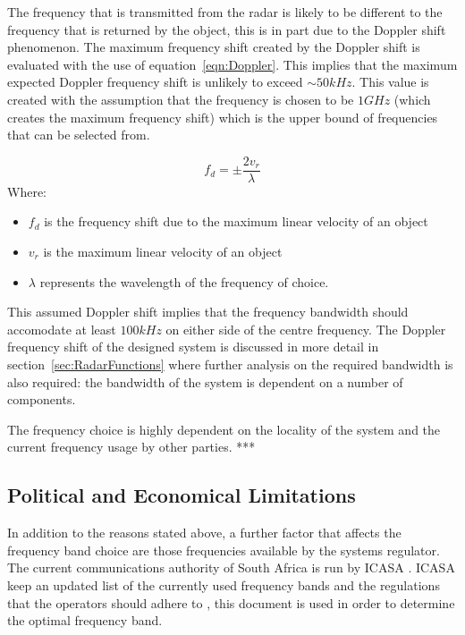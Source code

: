 \documentclass[11pt]{witseiepaper}
\begin{document}
The frequency that is transmitted from the radar is likely to be different to the frequency that is returned by the object, this is in part due to the Doppler shift phenomenon. The maximum frequency shift created by the Doppler shift is evaluated with the use of equation~\ref{eqn:Doppler}. This implies that the maximum expected Doppler frequency shift is unlikely to exceed $\sim 50 kHz$. This value is created with the assumption that the frequency is chosen to be $1 GHz$ (which creates the maximum frequency shift) which is the upper bound of frequencies that can be selected from.


\begin{equation} \label{eqn:Doppler}
    f_{d} = \pm \frac{2 v_{r}}{\lambda}    
\end{equation}
Where:
\begin{itemize}
    \item $f_{d}$ is the frequency shift due to the maximum linear velocity of an object
    \item $v_{r}$ is the maximum linear velocity of an object
    \item $\lambda$ represents the wavelength of the frequency of choice.
\end{itemize}

This assumed Doppler shift implies that the frequency bandwidth should accomodate at least $100 kHz$ on either side of the centre frequency.
The Doppler frequency shift of the designed system is discussed in more detail in section~\ref{sec:RadarFunctions} where further analysis on the required bandwidth is also required: the bandwidth of the system is dependent on a number of components.


The frequency choice is highly dependent on the locality of the system and the current frequency usage by other parties. ***


\subsection{Political and Economical Limitations} \label{PoliticalandEconomicalLimitations}

In addition to the reasons stated above, a further factor that affects the frequency band choice are those frequencies available by the systems regulator. The current communications authority of South Africa is run by ICASA \cite{ICASA}.
ICASA keep an updated list of the currently used frequency bands and the regulations that the operators should adhere to \cite{frequencyAllocation}, this document is used in order to determine the optimal frequency band.
\end{document}
